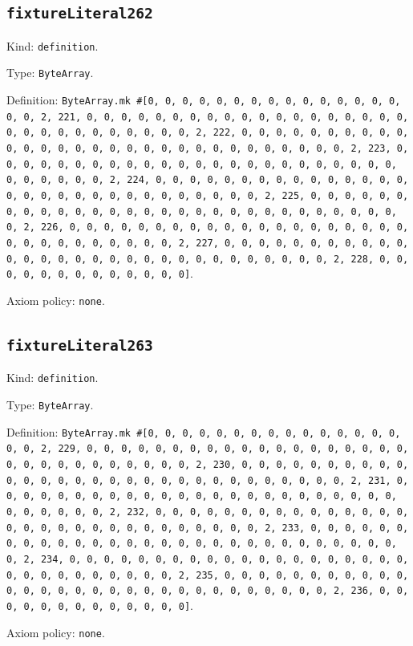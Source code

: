 \documentclass[11pt]{article}
\begin{document}
\subsection*{\texttt{fixtureLiteral262}}
\noindent Kind: \texttt{definition}.\par
\noindent Type: \texttt{ByteArray}.\par
\noindent Definition: \texttt{ByteArray.mk \#[0, 0, 0, 0, 0, 0, 0, 0, 0, 0, 0, 0, 0, 0, 0, 0, 0, 2, 221, 0, 0, 0, 0, 0, 0, 0, 0, 0, 0, 0, 0, 0, 0, 0, 0, 0, 0, 0, 0, 0, 0, 0, 0, 0, 0, 0, 0, 0, 0, 2, 222, 0, 0, 0, 0, 0, 0, 0, 0, 0, 0, 0, 0, 0, 0, 0, 0, 0, 0, 0, 0, 0, 0, 0, 0, 0, 0, 0, 0, 0, 0, 2, 223, 0, 0, 0, 0, 0, 0, 0, 0, 0, 0, 0, 0, 0, 0, 0, 0, 0, 0, 0, 0, 0, 0, 0, 0, 0, 0, 0, 0, 0, 0, 2, 224, 0, 0, 0, 0, 0, 0, 0, 0, 0, 0, 0, 0, 0, 0, 0, 0, 0, 0, 0, 0, 0, 0, 0, 0, 0, 0, 0, 0, 0, 0, 2, 225, 0, 0, 0, 0, 0, 0, 0, 0, 0, 0, 0, 0, 0, 0, 0, 0, 0, 0, 0, 0, 0, 0, 0, 0, 0, 0, 0, 0, 0, 0, 2, 226, 0, 0, 0, 0, 0, 0, 0, 0, 0, 0, 0, 0, 0, 0, 0, 0, 0, 0, 0, 0, 0, 0, 0, 0, 0, 0, 0, 0, 0, 0, 2, 227, 0, 0, 0, 0, 0, 0, 0, 0, 0, 0, 0, 0, 0, 0, 0, 0, 0, 0, 0, 0, 0, 0, 0, 0, 0, 0, 0, 0, 0, 0, 2, 228, 0, 0, 0, 0, 0, 0, 0, 0, 0, 0, 0, 0, 0]}.\par
\noindent Axiom policy: \texttt{none}.\par
\subsection*{\texttt{fixtureLiteral263}}
\noindent Kind: \texttt{definition}.\par
\noindent Type: \texttt{ByteArray}.\par
\noindent Definition: \texttt{ByteArray.mk \#[0, 0, 0, 0, 0, 0, 0, 0, 0, 0, 0, 0, 0, 0, 0, 0, 0, 2, 229, 0, 0, 0, 0, 0, 0, 0, 0, 0, 0, 0, 0, 0, 0, 0, 0, 0, 0, 0, 0, 0, 0, 0, 0, 0, 0, 0, 0, 0, 0, 2, 230, 0, 0, 0, 0, 0, 0, 0, 0, 0, 0, 0, 0, 0, 0, 0, 0, 0, 0, 0, 0, 0, 0, 0, 0, 0, 0, 0, 0, 0, 0, 2, 231, 0, 0, 0, 0, 0, 0, 0, 0, 0, 0, 0, 0, 0, 0, 0, 0, 0, 0, 0, 0, 0, 0, 0, 0, 0, 0, 0, 0, 0, 0, 2, 232, 0, 0, 0, 0, 0, 0, 0, 0, 0, 0, 0, 0, 0, 0, 0, 0, 0, 0, 0, 0, 0, 0, 0, 0, 0, 0, 0, 0, 0, 0, 2, 233, 0, 0, 0, 0, 0, 0, 0, 0, 0, 0, 0, 0, 0, 0, 0, 0, 0, 0, 0, 0, 0, 0, 0, 0, 0, 0, 0, 0, 0, 0, 2, 234, 0, 0, 0, 0, 0, 0, 0, 0, 0, 0, 0, 0, 0, 0, 0, 0, 0, 0, 0, 0, 0, 0, 0, 0, 0, 0, 0, 0, 0, 0, 2, 235, 0, 0, 0, 0, 0, 0, 0, 0, 0, 0, 0, 0, 0, 0, 0, 0, 0, 0, 0, 0, 0, 0, 0, 0, 0, 0, 0, 0, 0, 0, 2, 236, 0, 0, 0, 0, 0, 0, 0, 0, 0, 0, 0, 0, 0]}.\par
\noindent Axiom policy: \texttt{none}.\par
\end{document}
